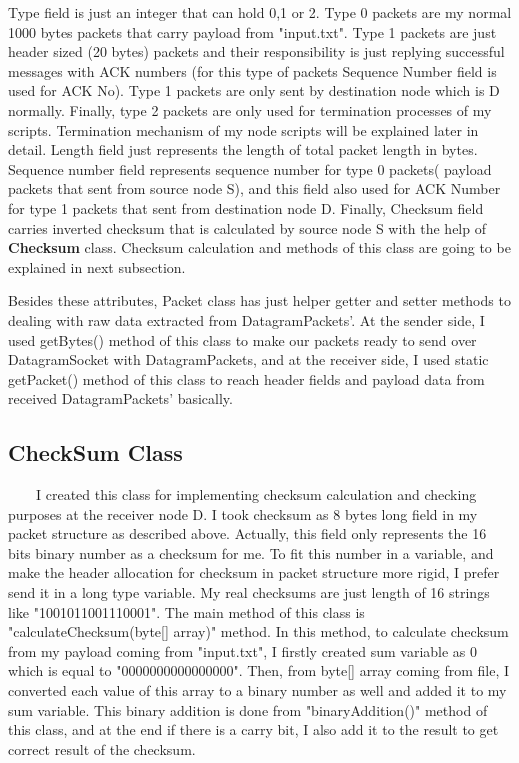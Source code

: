 \documentclass[12pt]{article}
\begin{document}
Type field is just an integer that can hold 0,1 or 2. Type 0 packets are my normal 1000 bytes packets that carry payload from "input.txt". Type 1 packets are just header sized (20 bytes) packets and their responsibility is just replying successful messages with ACK numbers (for this type of packets Sequence Number field is used for ACK No). Type 1 packets are only sent by destination node which is D normally. Finally, type 2 packets are only used for termination processes of my scripts. Termination mechanism of my node scripts will be explained later in detail. Length field just represents the length of total packet length in bytes. Sequence number field represents sequence number for type 0 packets( payload packets that sent from source node S), and this field also used for ACK Number for type 1 packets that sent from destination node D. Finally, Checksum field carries inverted checksum that is calculated by source node S with the help of \textbf{Checksum} class. Checksum calculation and methods of this class are going to be explained in next subsection.

Besides these attributes, Packet class has just helper getter and setter methods to dealing with raw data extracted from DatagramPackets'. At the sender side, I used getBytes() method of this class to make our packets ready to send over DatagramSocket with DatagramPackets, and at the receiver side, I used static getPacket() method of this class to reach header fields and payload data from received DatagramPackets' basically.

\subsection{CheckSum Class}
\ \ \ \ I created this class for implementing checksum calculation and checking purposes at the receiver node D. I took checksum as 8 bytes long field in my packet structure as described above. Actually, this field only represents the 16 bits binary number as a checksum for me. To fit this number in a variable, and make the header allocation for checksum in packet structure more rigid, I prefer send it in a long type variable. My real checksums are just length of 16 strings like "1001011001110001". The main method of this class is "calculateChecksum(byte[] array)" method. In this method, to calculate checksum from my payload coming from "input.txt", I firstly created sum variable as 0 which is equal to "0000000000000000". Then, from byte[] array coming from file, I converted each value of this array to a binary number as well and added it to my sum variable. This binary addition is done from "binaryAddition()" method of this class, and at the end if there is a carry bit, I also add it to the result to get correct result of the checksum. 
\end{document}

